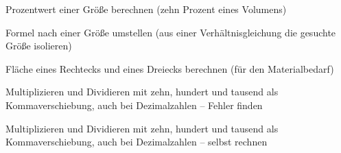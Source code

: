 \begin{aufgabe}{Prozentwert einer Größe berechnen (zehn Prozent eines Volumens)}
\end{aufgabe}

\begin{aufgabe}{Formel nach einer Größe umstellen (aus einer Verhältnisgleichung die gesuchte Größe isolieren)}
\end{aufgabe}

\begin{aufgabe}{Fläche eines Rechtecks und eines Dreiecks berechnen (für den Materialbedarf)}
\end{aufgabe}

\begin{aufgabe}{Multiplizieren und Dividieren mit zehn, hundert und tausend als Kommaverschiebung, auch bei Dezimalzahlen – Fehler finden}
\end{aufgabe}

\begin{aufgabe}{Multiplizieren und Dividieren mit zehn, hundert und tausend als Kommaverschiebung, auch bei Dezimalzahlen – selbst rechnen}
\end{aufgabe}
